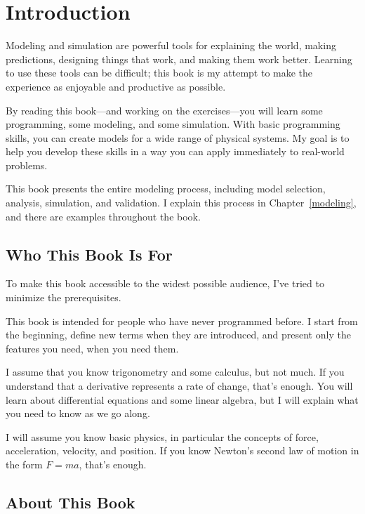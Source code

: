 \chapter*{Introduction}
\adjustmtc
{}

Modeling and simulation are powerful tools for explaining the world, making predictions, designing things that work, and making them work better.  Learning to use these tools can be difficult; this book is my attempt to make the experience as enjoyable and productive as possible.

By reading this book---and working on the exercises---you will learn some programming, some modeling, and some simulation.
With basic programming skills, you can create models for a wide range of physical systems.
My goal is to help you develop these skills in a way you can apply immediately to real-world problems.

This book presents the entire modeling process, including model selection, analysis, simulation, and validation.  I explain this process in Chapter~\ref{modeling}, and there are examples throughout the book.

\section{Who This Book Is For}

To make this book accessible to the widest possible audience, I've tried to minimize the prerequisites.

This book is intended for people who have never programmed before.  I start from the beginning, define new terms when they are introduced, and present only the features you need, when you need them.

I assume that you know trigonometry and some calculus, but not much.  If you understand that a derivative represents a rate of change, that's enough.  You will learn about differential equations and some linear algebra, but I will explain what you need to know as we go along.

I will assume you know basic physics, in particular the concepts of force, acceleration, velocity, and position.  If you know Newton's second law of motion in the form $F = m a$, that's enough.

\section{About This Book}

